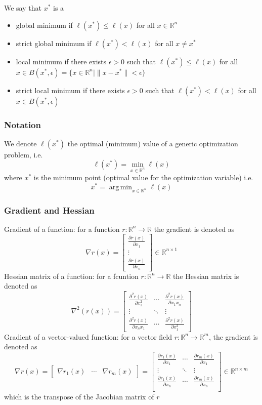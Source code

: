 \documentclass{book}
\DeclareMathOperator*{\argmin}{arg\,min}
\newcommand{\R}{\mathbb{R}}
\theoremstyle{definition}
\theoremstyle{remark}
\theoremstyle{remark}
\begin{document}
We say that $x^*$ is a  
\begin{itemize}
    \item global minimum if $\ell(x^*)\leq\ell(x)$ for all $x\in\R^n$ 
    \item strict global minimum if $\ell(x^*)<\ell(x)$ for all $x\neq x^*$
    \item local minimum if there exists $\epsilon>0$ such that $\ell(x^*)\leq\ell(x)$ for all $x\in B(x^*,\epsilon) = \{x\in\R^n| \|x-x^*\|<\epsilon\}$
    \item strict local minimum if there exists $\epsilon>0$ such that $\ell(x^*)<\ell(x)$ for all $x\in B(x^*,\epsilon)$ 

\end{itemize}
\subsubsection{Notation}
We denote $\ell(x^*)$ the optimal (minimum) value of a generic optimization problem, i.e. 
\[
    \ell(x^*) = \min_{x\in\R^n}\ell(x)
\]
where $x^*$ is the minimum point (optimal value for the optimization variable) i.e. 
\[
    x^* = \argmin_{x\in\R^n} \ell(x)
\]
\subsubsection{Gradient and Hessian}
Gradient of a function: for a function $r:\R^n\to\R$  the gradient is denoted as 
\[
    \nabla r(x) = \begin{bmatrix}
        \displaystyle\frac{\partial r(x)}{\partial x_1} \\ \vdots \\ \displaystyle\frac{\partial r(x)}{\partial x_n}
    \end{bmatrix} \in \R^{n\times 1}
\]
Hessian matrix of a function: for a fcuntion $r:\R^n\to\R$  the Hessian matrix is denoted as 
\[
    \nabla^2(r(x)) = \begin{bmatrix}
        \displaystyle\frac{\partial^2 r(x)}{\partial x_1^2} & \cdots & \displaystyle\frac{\partial^2 r(x)}{\partial x_1x_n} \\ \vdots & \ddots & \vdots \\ \displaystyle\frac{\partial^2 r(x)}{\partial x_nx_1} & \cdots & \displaystyle\frac{\partial^2 r(x)}{\partial x_1^2}
    \end{bmatrix}
\]
Gradient of a vector-valued function: for a vector field $r:\R^n\to\R^m$, the gradient is denoted as 
\[
    \nabla r(x) = \begin{bmatrix}
        \nabla r_1(x) & \cdots & \nabla r_m(x)
        \end{bmatrix} = \begin{bmatrix}
        \displaystyle\frac{\partial r_1(x)}{\partial x_1} & \cdots & \displaystyle\frac{\partial r_m(x)}{\partial x_1} \\
        \vdots & \ddots & \vdots \\
        \displaystyle\frac{\partial r_1(x)}{\partial x_n} & \cdots & \displaystyle\frac{\partial r_m(x)}{\partial x_n} \\
    \end{bmatrix} \in \R^{n\times m}
\]
which is the transpose of the Jacobian matrix of $r$
\end{document}
